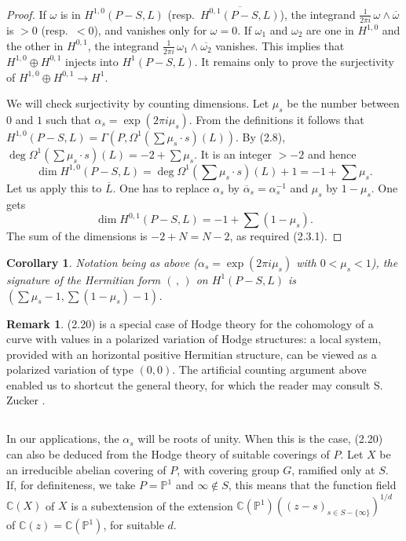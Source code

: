 \documentclass[12pt,a4paper]{article}
\theoremstyle{plain}
\newtheorem{corollary}[theorem]{Corollary}
\theoremstyle{definition}
\newtheorem{remark}[theorem]{Remark}
\theoremstyle{remark}
\newcommand{\CC}{\mathbb{C}}
\newcommand{\PP}{\mathbb{P}}
\numberwithin{equation}{section}
\providecommand{\CC}{\mathbb{C}}
\providecommand{\PP}{\mathbb{P}}
\begin{document}
\begin{proof}
If $\omega$ is in $H^{1,0}(P-S, L)$ (resp.\ $\overline{H^{0,1}(P-S, L)}$), the integrand $\frac{1}{2\pi i} \, \omega \wedge \overline{\omega}$ is $> 0$ (resp.\ $< 0$), and vanishes only for $\omega = 0$. If $\omega_1$ and $\omega_2$ are one in $H^{1,0}$ and the other in $H^{0,1}$, the integrand $\frac{1}{2\pi i} \, \omega_1 \wedge \overline{\omega_2}$ vanishes. This implies that $H^{1,0} \oplus H^{0,1}$ injects into $H^1(P-S, L)$. It remains only to prove the surjectivity of $H^{1,0} \oplus H^{0,1} \to H^1$.

We will check surjectivity by counting dimensions. Let $\mu_s$ be the number between $0$ and $1$ such that $\alpha_s = \exp(2\pi i \mu_s)$. From the definitions it follows that $H^{1,0}(P-S, L) = \Gamma(P, \Omega^1(\sum \mu_s \cdot s)(L))$. By (2.8), $\deg \Omega^1(\sum \mu_s \cdot s)(L) = -2 + \sum \mu_s$. It is an integer $> -2$ and hence
\begin{equation}\label{eq:2.20.1}
\dim H^{1,0}(P-S, L) = \deg \Omega^1(\sum \mu_s \cdot s)(L) + 1 = -1 + \sum \mu_s.
\end{equation}
Let us apply this to $\overline{L}$. One has to replace $\alpha_s$ by $\overline{\alpha}_s = \alpha_s^{-1}$ and $\mu_s$ by $1-\mu_s$. One gets
\begin{equation}\label{eq:2.20.2}
\dim H^{0,1}(P-S, L) = -1 + \sum (1-\mu_s).
\end{equation}
The sum of the dimensions is $-2 + N = N-2$, as required (2.3.1).
\end{proof}

\begin{corollary}\label{cor:2.21}
Notation being as above ($\alpha_s = \exp(2\pi i \mu_s)$ with $0 < \mu_s < 1$), the signature of the Hermitian form $(\,,\,)$ on $H^1(P-S, L)$ is $(\sum \mu_s - 1, \sum(1-\mu_s) - 1)$.
\end{corollary}

\begin{remark}\label{rmk:2.22}
(2.20) is a special case of Hodge theory for the cohomology of a curve with values in a polarized variation of Hodge structures: a local system, provided with an horizontal positive Hermitian structure, can be viewed as a polarized variation of type $(0,0)$. The artificial counting argument above enabled us to shortcut the general theory, for which the reader may consult S. Zucker \cite{Zucker}.
\end{remark}

\subsection{}
In our applications, the $\alpha_s$ will be roots of unity. When this is the case, (2.20) can also be deduced from the Hodge theory of suitable coverings of $P$. Let $X$ be an irreducible abelian covering of $P$, with covering group $G$, ramified only at $S$. If, for definiteness, we take $P = \PP^1$ and $\infty \notin S$, this means that the function field $\CC(X)$ of $X$ is a subextension of the extension $\CC(\PP^1)((z-s)_{s \in S - \{\infty\}})^{1/d}$ of $\CC(z) = \CC(\PP^1)$, for suitable $d$.
\end{document}
